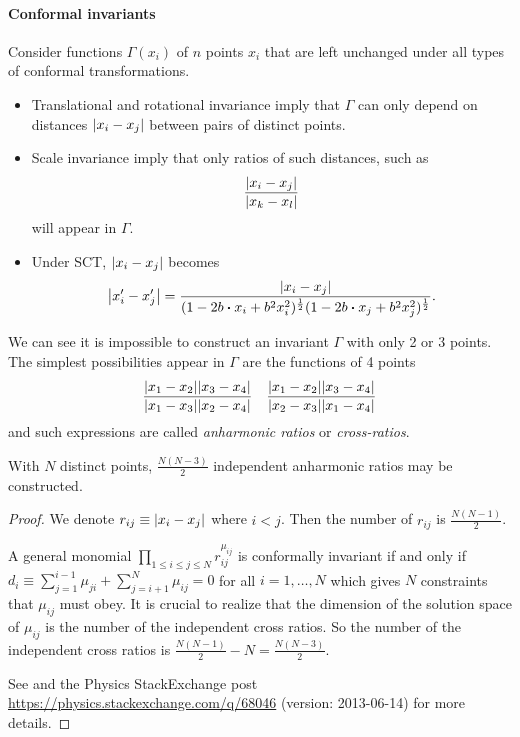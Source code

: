 \documentclass[10pt]{article}
\begin{document}
\paragraph{Conformal invariants}
Consider functions $\Gamma(x_i)$ of $n$ points $x_i$ that are left unchanged under all types of conformal transformations.
\begin{itemize}
    \item Translational and rotational invariance imply that $\Gamma$ can only depend on distances $\abs{x_i-x_j}$ between pairs of distinct points.
    \item Scale invariance imply that only ratios of such distances, such as 
            \begin{align}
                \frac{\abs{x_i-x_j}}{\abs{x_k-x_l}}
            \end{align}
            will appear in $\Gamma$.
    \item Under SCT, $\abs{x_i-x_j}$ becomes 
            \begin{align}
                \abs{x_i'-x_j'}=\frac{\abs{x_i-x_j}}{(1-2b\vdot x_i+b^2 x_i^2)^{\frac{1}{2}}(1-2b\vdot x_j+b^2 x_j^2)^{\frac{1}{2}}}.\label{eq:conformal_distance_trans}
            \end{align}
\end{itemize} 
We can see it is impossible to construct an invariant $\Gamma$ with only 2 or 3 points.
The simplest possibilities appear in $\Gamma$ are the functions of 4 points
\begin{align}
    \frac{\abs{x_1-x_2}\abs{x_3-x_4}}{\abs{x_1-x_3}\abs{x_2-x_4}}\quad\frac{\abs{x_1-x_2}\abs{x_3-x_4}}{\abs{x_2-x_3}\abs{x_1-x_4}}
\end{align}
and such expressions are called \textit{anharmonic ratios} or \textit{cross-ratios}.
\begin{claim}
    With $N$ distinct points, $\frac{N(N-3)}{2}$ independent anharmonic ratios may be constructed.
\end{claim}
\begin{proof}
    We denote $r_{ij}\equiv\abs{x_i-x_j}$ where $i<j$.
    Then the number of $r_{ij}$ is $\frac{N(N-1)}{2}$.
    
    A general monomial $\prod_{1\leq i\leq j\leq N}r^{\mu_{ij}}_{ij}$ is conformally invariant if and only if $d_i\equiv\sum^{i-1}_{j=1}\mu_{ji}+\sum^N_{j=i+1}\mu_{ij}=0$ for all $i=1,\dots,N$ which gives $N$ constraints that $\mu_{ij}$ must obey.
    It is crucial to realize that the dimension of the solution space of $\mu_{ij}$ is the number of the independent cross ratios\snm.
    So the number of the independent cross ratios is $\frac{N(N-1)}{2}-N=\frac{N(N-3)}{2}$.

    See \cite{Ginsparg:1988ui} and the Physics StackExchange post \url{https://physics.stackexchange.com/q/68046} (version: 2013-06-14) for more details.
\end{proof}
\end{document}
